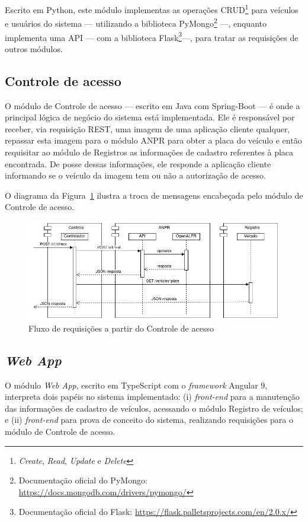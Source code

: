 \documentclass[12pt]{article}
\begin{document}
Escrito em Python, este módulo implementas as operações CRUD\footnote{\textit{Create}, \textit{Read}, \textit{Update} e \textit{Delete}} para veículos e usuários do sistema — utilizando a biblioteca PyMongo\footnote{Documentação oficial do PyMongo: \url{https://docs.mongodb.com/drivers/pymongo/}} —, enquanto implementa uma API — com a biblioteca Flask\footnote{Documentação oficial do Flask: \url{https://flask.palletsprojects.com/en/2.0.x/}}—, para tratar as requisições de outros módulos.

\subsection{Controle de acesso}

O módulo de Controle de acesso — escrito em Java com Spring-Boot — é onde a principal lógica de negócio do sistema está implementada. Ele é responsável por receber, via requisição REST, uma imagem de uma aplicação cliente qualquer, repassar esta imagem para o módulo ANPR para obter a placa do veículo e então requisitar ao módulo de Registros as informações de cadastro referentes à placa encontrada. De posse dessas informações, ele responde a aplicação cliente informando se o veículo da imagem tem ou não a autorização de acesso.

O diagrama da Figura~\ref{fig:check4j} ilustra a troca de mensagens encabeçada pelo módulo de Controle de acesso.

\begin{figure}[ht]
	\centering
	\includegraphics[width=1\textwidth]{check4j.jpg}
	\caption{Fluxo de requisições a partir do Controle de acesso}
	\label{fig:check4j}
\end{figure}

\subsection{\textit{Web App}}

O módulo \textit{Web App}, escrito em TypeScript com o \textit{framework} Angular 9, interpreta dois papéis no sistema implementado: (i) \textit{front-end} para a manutenção das informações de cadastro de veículos, acessando o módulo Registro de veículos; e (ii) \textit{front-end} para prova de conceito do sistema, realizando requisições para o módulo de Controle de acesso.
\end{document}
